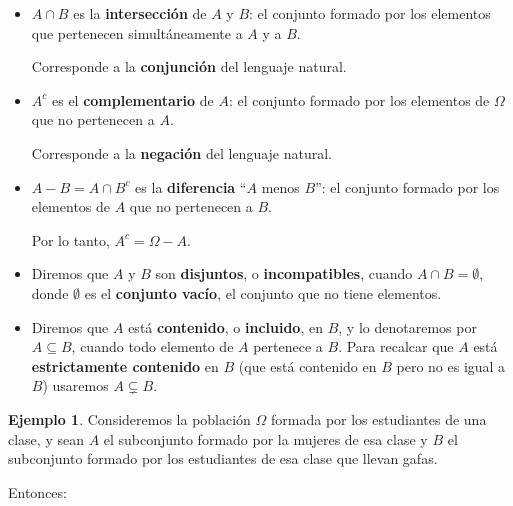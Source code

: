 \documentclass[
]{book}
\theoremstyle{definition}
\theoremstyle{definition}
\newtheorem{example}{Ejemplo}[chapter]
\theoremstyle{definition}
\theoremstyle{definition}
\theoremstyle{remark}
\begin{document}
\begin{itemize}
\item
  \(A \cap B\) es la \textbf{intersección} de \(A\) y \(B\): el conjunto formado por los elementos que pertenecen simultáneamente a \(A\) y a \(B\).

  Corresponde a la \textbf{conjunción} del lenguaje natural.
\item
  \(A^c\) es el \textbf{complementario} de \(A\): el conjunto formado por los elementos de \(\Omega\) que no pertenecen a \(A\).

  Corresponde a la \textbf{negación} del lenguaje natural.
\item
  \(A-B=A \cap B^c\) es la \textbf{diferencia} ``\(A\) menos \(B\)'': el conjunto formado por los elementos de \(A\) que no pertenecen a \(B\).

  Por lo tanto, \(A^c=\Omega-A\).
\item
  Diremos que \(A\) y \(B\) son \textbf{disjuntos}, o \textbf{incompatibles}, cuando \(A\cap B=\emptyset\), donde \(\emptyset\) es el \textbf{conjunto vacío}, el conjunto que no tiene elementos.
\item
  Diremos que \(A\) está \textbf{contenido}, o \textbf{incluido}, en \(B\), y lo denotaremos por \(A\subseteq B\), cuando todo elemento de \(A\) pertenece a \(B\). Para recalcar que \(A\) está \textbf{estrictamente contenido} en \(B\) (que está contenido en \(B\) pero no es igual a \(B\)) usaremos \(A\subsetneq B\).
\end{itemize}

\begin{example}
\protect\hypertarget{exm:unnamed-chunk-86}{}\label{exm:unnamed-chunk-86}Consideremos la población \(\Omega\) formada por los estudiantes de una clase, y sean \(A\) el subconjunto formado por la mujeres de esa clase y \(B\) el subconjunto formado por los estudiantes de esa clase que llevan gafas.
\end{example}

Entonces:
\end{document}
